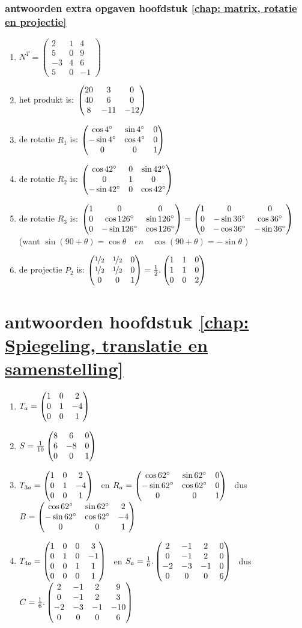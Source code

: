 \documentclass[hidelinks, a4wide, 12pt,  twoside]{book}
\begin{document}
\subsubsection{antwoorden extra opgaven hoofdstuk \ref{chap: matrix, rotatie en projectie}}
\begin{enumerate}
	\item
	$ N^{T} =	\begin{pmatrix}
	2 & 1 & 4\\
	5&0&9\\
	-3&4&6\\
	5&0&-1 
	\end{pmatrix} $
	\item
	het produkt is:  
	$ \begin{pmatrix} 20&3&0 \\ 40&6&0 \\ 8&-11&-12 \end{pmatrix} $
	\item    de rotatie   \textit{$ R_1  $}  is:  
	$ \begin{pmatrix} \cos  4 \degree  & \sin 4 \degree &0 \\  -\sin 4 \degree & \cos 4 \degree&0 \\ 0&0&1 \end{pmatrix} $
	\item de rotatie   \textit{$ R_2  $}  is:  
	$ \begin{pmatrix} \cos  42 \degree  & 0& \sin 42 \degree  \\ 0&1&0 \\  -\sin 42\degree &  0 &\cos 42 \degree \end{pmatrix} 
	$
	\item     de rotatie \textit{$ R_3  $} is:  
	$ \begin{pmatrix} 1&0&0 \\ 0&\cos  126 \degree  & \sin 126 \degree \\ 0& -\sin 126 \degree & \cos 126 \degree \end{pmatrix}  
	= \begin{pmatrix} 1&0&0 \\ 0&-\sin  36 \degree  & \cos 36 \degree \\ 0& -\cos 36 \degree & -\sin 36 \degree \end{pmatrix}  $ \\
	(want $ \sin(90+\theta)  = \cos \theta \quad en \quad \cos(90+\theta)  = -\sin \theta $ )
	\item   de projectie \textit{ $ P_2 $ } is:  
	$ \begin{pmatrix} \nicefrac{1}{2}&\nicefrac{1}{2}&0 \\ \nicefrac{1}{2}&\nicefrac{1}{2}  & 0 \\ 0& 0 & 1 \end{pmatrix}  
	= \frac{1}{2} .\begin{pmatrix} 1&1&0 \\ 1&1  & 0 \\ 0& 0 & 2 \end{pmatrix} $    
	
\end{enumerate}

\section{antwoorden  hoofdstuk \ref{chap: Spiegeling, translatie en samenstelling}}
\begin{enumerate}
	\item $ T_a = \begin{pmatrix} 1&0&2 \\ 0&1&-4 \\ 0&0&1 \end{pmatrix} $ 
	
	\item $   S = \frac{1}{10} \begin{pmatrix} 8&6&0 \\ 6&-8&0 \\ 0&0&1 \end{pmatrix}  $ 
	
	\item $ T_{3a} = \begin{pmatrix} 1&0&2 \\ 0&1&-4 \\ 0&0&1 \end{pmatrix} $ 
	\ en $ R_a= \begin{pmatrix} \cos 62 \degree &\sin 62 \degree&0 \\ -\sin 62 \degree&\cos 62 \degree&0 \\ 0&0&1 \end{pmatrix} $ 
	\ dus $ B= \begin{pmatrix} \cos 62 \degree &\sin 62 \degree&2 \\ -\sin 62 \degree&\cos 62 \degree&-4 \\ 0&0&1 \end{pmatrix} $ 
	
	
	\item $ T_{4a} = \begin{pmatrix} 1&0&0&3 \\ 0&1&0&-1 \\ 0&0&1&1 \\ 0&0&0&1 \end{pmatrix} $
	\ en $ S_a= \frac{1}{6}.\begin{pmatrix} 2&-1&2&0 \\ 0&-1&2&0 \\ -2&-3&-1&0 \\ 0&0&0&6 \end{pmatrix} $
	\ dus $ C = \frac{1}{6}. \begin{pmatrix} 2&-1&2&9 \\ 0&-1&2&3 \\ -2&-3&-1&-10 \\ 0&0&0&6 \end{pmatrix} $
	
	
\end{enumerate}
\end{document}
